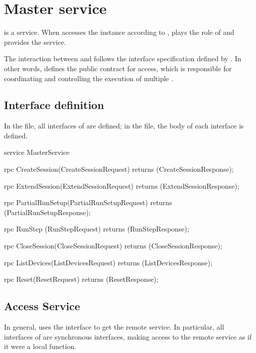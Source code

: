 \section{Master service}
\begin{content}

 is a  service. When  accesses the  instance according to ,  plays the role of  and provides the  service.

The interaction between  and  follows the interface specification defined by . In other words,  defines the public contract for  access, which is responsible for coordinating and controlling the execution of multiple .


\subsection{Interface definition}
In the  file, all interfaces of  are defined; in the  file, the body of each interface is defined.

\begin{leftbar}
\begin{c++}
service MasterService {
  rpc CreateSession(CreateSessionRequest) 
      returns (CreateSessionResponse);
  
  rpc ExtendSession(ExtendSessionRequest) 
      returns (ExtendSessionResponse);

  rpc PartialRunSetup(PartialRunSetupRequest) 
      returns (PartialRunSetupResponse);

  rpc RunStep (RunStepRequest) 
      returns (RunStepResponse);
  
  rpc CloseSession(CloseSessionRequest) 
      returns (CloseSessionResponse);
  
  rpc ListDevices(ListDevicesRequest) 
      returns (ListDevicesResponse);

  rpc Reset(ResetRequest) 
      returns (ResetResponse);
}
\end{c++}
\end{leftbar}


\subsection{Access Service}
In general,  uses the interface  to get the remote  service. In particular, all interfaces of  are synchronous interfaces, making  access to the remote  service as if it were a local function.


\end{content}

